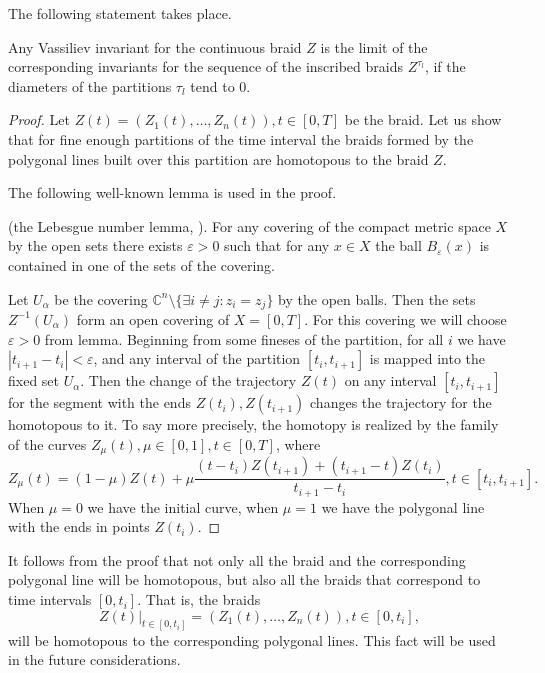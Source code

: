 \documentclass[12pt, a4paper, titlepage]{article}
\begin{document}
The following statement takes place. 
\begin{theorem}\label{KontsevichWithPLsApproximationTheorem}
Any Vassiliev invariant for the continuous braid $Z$ is the limit of the corresponding 
invariants for the sequence of the inscribed braids $Z^{\tau_l}$, if the diameters of the partitions
$\tau_l$ tend to $0$. 
\end{theorem}
\begin{proof}
Let $Z(t)=(Z_1(t),\dots,Z_n(t)), t\in [0,T]$ be the braid.
Let us show that for fine enough partitions of the time interval the braids 
formed by the polygonal lines built over this partition are homotopous to the braid $Z$.

The following well-known lemma is used in the proof. 
 \begin{lem}(the Lebesgue number lemma, \cite[p.~179]{MunkresJames}).
 For any covering of the compact metric space $X$ by the open sets
 there exists $\varepsilon>0$ such that for any $x\in X$ 
 the ball $B_{\varepsilon}(x)$ is contained in one of the sets of the covering.
 \end{lem}

Let $U_{\alpha}$ be the covering $\mathbb{C}^n \setminus \{\exists i \ne j : z_i = z_j\}$ 
by the open balls. Then the sets 
$Z^{-1}(U_{\alpha})$ form an open covering of $X=[0,T]$. For this covering we will choose
$\varepsilon>0$ from lemma. Beginning from some fineses of the partition,
for all $i$ we have
$|t_{i+1}-t_i|<\varepsilon$, and any interval of the partition $[t_i,t_{i+1}]$ is mapped 
into the fixed set $U_{\alpha}$. Then the change of the trajectory $Z(t)$ on any interval
$[t_i,t_{i+1}]$ for the segment with the ends $Z(t_i), Z(t_{i+1})$ 
changes the trajectory for the homotopous to it. 
To say more precisely, the homotopy is realized by the family of the curves 
$Z_{\mu}(t), \mu\in [0,1], t\in [0,T]$, where
$$Z_{\mu}(t)=(1-\mu)Z(t)+\mu\frac{(t-t_i)Z(t_{i+1})+(t_{i+1}-t)Z(t_i)}{t_{i+1}-t_i}, t\in [t_i,t_{i+1}].$$
When $\mu=0$ we have the initial curve, when $\mu=1$ we have the polygonal line 
with the ends in points $Z(t_i).$
\end{proof}

\begin{remark}\label{PartialIntervalHomotopyRemark} It follows from the proof that not only
all the braid and the corresponding polygonal line will be homotopous,
but also all the braids that correspond to time intervals $[0,t_i]$. That is, the braids
\begin{equation}\nonumber
\left.Z(t)\right |_{t\in[0,t_i]}=(Z_1(t),\dots,Z_n(t)), t\in [0,t_i],
\end{equation}
will be homotopous to the corresponding polygonal lines. 
This fact will be used in the future considerations. 
\end{remark}
\end{document}

